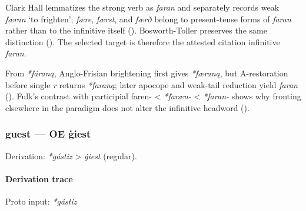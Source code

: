 \documentclass[
  british,
  a4paper,
]{article}
\begin{document}
Clark Hall lemmatizes the strong verb as \emph{faran} and separately
records weak \emph{færan} `to frighten'; \emph{fære}, \emph{færst}, and
\emph{færð} belong to present-tense forms of \emph{faran} rather than to
the infinitive itself ().
Bosworth-Toller preserves the same distinction
(). The
selected target is therefore the attested citation infinitive
\emph{faran}.

From \emph{*fáraną}, Anglo-Frisian brightening first gives
\emph{*færaną}, but A-restoration before single \emph{r} returns
\emph{*faraną}; later apocope and weak-tail reduction yield \emph{faran}
(). Fulk's contrast with
participial faren- \textless{} \emph{*faræn-} \textless{} \emph{*faran-}
shows why fronting elsewhere in the paradigm does not alter the
infinitive headword ().

\subsubsection{guest --- OE ġiest}\label{guest-oe-ux121iest-1}

Derivation: \emph{*gástiz} \textgreater{} \emph{ġiest} (regular).

\paragraph{Derivation trace}\label{derivation-trace-18}

Proto input: \emph{*gástiz}

\begingroup
\setlength{\fboxsep}{6pt}
\end{document}
